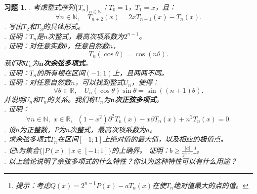 \documentclass[12pt,UTF8]{ctexbook}
\theoremstyle{definition}
\theoremstyle{plain}
\newtheorem{xt}{习题}[section]
\begin{document}
\begin{appendix}
\begin{xt}
    . 考虑整式序列$\{T_n\}_{n\in\mathbb{N}}$：$T_0 = 1$，$T_1 = x$，且：
    $$ \forall n\in\mathbb{N}, \quad T_{n+2}(x) = 2xT_{n+1}(x) - T_n(x).$$
    . 写出$T_2$和$T_3$的具体形式。\\
    . 证明：$T_n$是$n$次整式，最高次项系数为$2^{n-1}$。\\
    . 证明：对任意实数$\theta$，任意自然数$n$，
    $$ T_n(\cos{\theta}) = \cos{(n\theta)}.$$
    我们称$T_n$为$\boldsymbol{n}$\textbf{次余弦多项式}。\\
    . 证明：$T_n$的所有根在区间$(-1;1)$上，且两两不同。\\
    . 证明：对任意自然数$n$，可以找到整式$U_n$，使得：
    $$ \forall \theta \in \mathbb{R}, \quad U_n(\cos{\theta}) \sin{\theta} = \sin{((n+1)\theta)}. $$
    并说明$U_n$和$T_n$的关系。我们称$U_n$为$\boldsymbol{n}$\textbf{次正弦多项式}。\\
    . 证明：
    $$ \forall n\in\mathbb{N},\,\, x\in\mathbb{R}, \;\; (1 - x^2)\partial^2 T_n(x) - x\partial T_n(x) + n^2 T_n(x) = 0.$$
    . 设$n$为正整数，$P$为$n$次整式，最高次项系数为$a$。\\
    . 求余弦多项式$T_n$在区间$[-1;1]$上绝对值的最大值，以及相应的极值点。\\
    . 记$b$为集合$\{|P(x)| \, | \, x\in[-1;1]\}$的上确界。
    证明：$b \geqslant \frac{|a|}{2^{n-1}}$\footnote{提示：考虑$Q(x) = 2^{n-1}P(x) - aT_n(x)$在使$T_n$绝对值最大的点的值。}。\\
    . 以上结论说明了余弦多项式的什么特性？你认为这种特性可以有什么用途？
\end{xt}
\end{appendix}
\end{document}
